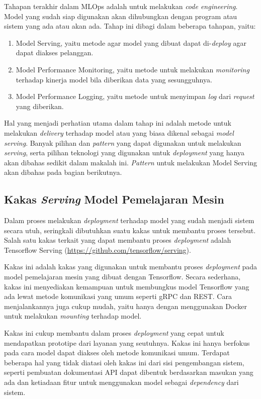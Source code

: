 Tahapan terakhir dalam MLOps adalah untuk melakukan \textit{code engineering}.
Model yang sudah siap digunakan akan dihubungkan dengan program atau sistem yang ada atau akan ada.
Tahap ini dibagi dalam beberapa tahapan, yaitu:

\begin{enumerate}
  \item Model Serving, yaitu metode agar model yang dibuat dapat di-\textit{deploy} agar dapat diakses pelanggan.
  \item Model Performance Monitoring, yaitu metode untuk melakukan \textit{monitoring} terhadap kinerja model bila diberikan data yang sesungguhnya.
  \item Model Performance Logging, yaitu metode untuk menyimpan \textit{log} dari \textit{request} yang diberikan.
\end{enumerate}

Hal yang menjadi perhatian utama dalam tahap ini adalah metode untuk melakukan \textit{delivery} terhadap model atau yang biasa dikenal sebagai \textit{model serving}.
Banyak pilihan dan \textit{pattern} yang dapat digunakan untuk melakukan \textit{serving}, serta pilihan teknologi yang digunakan untuk \textit{deployment} yang hanya akan dibahas sedikit dalam makalah ini.
\textit{Pattern} untuk melakukan Model Serving akan dibahas pada bagian berikutnya.

\subsection{Kakas \textit{Serving} Model Pemelajaran Mesin}

Dalam proses melakukan \textit{deployment} terhadap model yang sudah menjadi sistem secara utuh, seringkali dibutuhkan suatu kakas untuk membantu proses tersebut.
Salah satu kakas terkait yang dapat membantu proses \textit{deployment} adalah Tensorflow Serving (\href{https://github.com/tensorflow/serving}{https://github.com/tensorflow/serving}).

Kakas ini adalah kakas yang digunakan untuk membantu proses \textit{deployment} pada model pemelajaran mesin yang dibuat dengan Tensorflow.
Secara sederhana, kakas ini menyediakan kemampuan untuk membungkus model Tensorflow yang ada lewat metode komunikasi yang umum seperti gRPC dan REST.\@
Cara menjalankannya juga cukup mudah, yaitu hanya dengan menggunakan Docker untuk melakukan \textit{mounting} terhadap model.

Kakas ini cukup membantu dalam proses \textit{deployment} yang cepat untuk mendapatkan prototipe dari layanan yang seutuhnya.
Kakas ini hanya berfokus pada cara model dapat diakses oleh metode komunikasi umum.
Terdapat beberapa hal yang tidak diatasi oleh kakas ini dari sisi pengembangan sistem, seperti pembuatan dokumentasi API dapat dibentuk berdasarkan masukan yang ada dan ketiadaan fitur untuk menggunakan model sebagai \textit{dependency} dari sistem.

